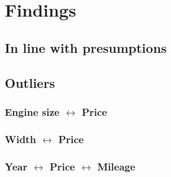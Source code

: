 \section{Findings}
\subsection{In line with presumptions}
\subsection{Outliers}
\subsubsection{Engine size $\leftrightarrow$ Price}
\subsubsection{Width $\leftrightarrow$ Price}
\subsubsection{Year $\leftrightarrow$ Price $\leftrightarrow$ Mileage}
